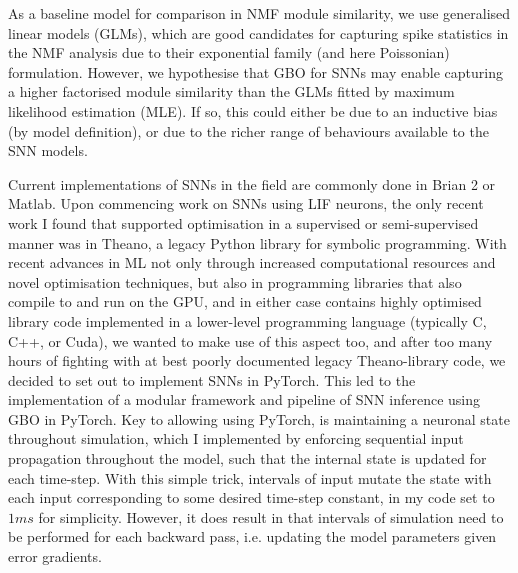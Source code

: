\documentclass[mphil,deptreport,ianc]{infthesis} %
\begin{document}
As a baseline model for comparison in NMF module similarity, we use generalised linear models (GLMs), which are good candidates for capturing spike statistics in the NMF analysis due to their exponential family (and here Poissonian) formulation.
However, we hypothesise that GBO for SNNs may enable capturing a higher factorised module similarity than the GLMs fitted by maximum likelihood estimation (MLE).
If so, this could either be due to an inductive bias (by model definition), or due to the richer range of behaviours available to the SNN models.


Current implementations of SNNs in the field are commonly done in Brian 2 or Matlab. 
Upon commencing work on SNNs using LIF neurons, the only recent work I found that supported optimisation in a supervised or semi-supervised manner was in Theano, a legacy Python library for symbolic programming.
With recent advances in ML not only through increased computational resources and novel optimisation techniques, but also in programming libraries that also compile to and run on the GPU, and in either case contains highly optimised library code implemented in a lower-level programming language (typically C, C++, or Cuda), we wanted to make use of this aspect too, and after too many hours of fighting with at best poorly documented legacy Theano-library code, we decided to set out to implement SNNs in PyTorch.
This led to the implementation of a modular framework and pipeline of SNN inference using GBO in PyTorch.
Key to allowing using PyTorch, is maintaining a neuronal state throughout simulation, which I implemented by enforcing sequential input propagation throughout the model, such that the internal state is updated for each time-step.
With this simple trick, intervals of input mutate the state with each input corresponding to some desired time-step constant, in my code set to $1 \si{ms}$ for simplicity.
However, it does result in that intervals of simulation need to be performed for each backward pass, i.e. updating the model parameters given error gradients.
\end{document}
